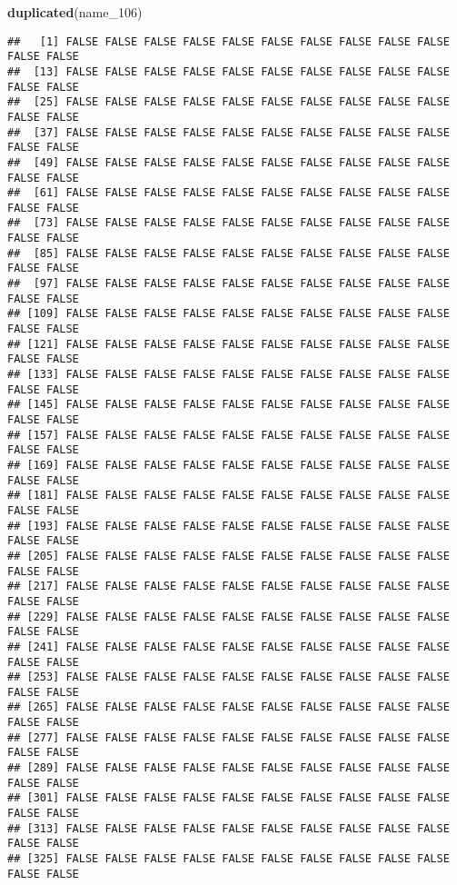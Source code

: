 \documentclass[
]{article}
\newenvironment{Shaded}{\begin{snugshade}}{\end{snugshade}}
\newcommand{\FunctionTok}[1]{\textcolor[rgb]{0.13,0.29,0.53}{\textbf{#1}}}
\newcommand{\NormalTok}[1]{#1}
\begin{document}
\begin{Shaded}
\begin{Highlighting}[]
\FunctionTok{duplicated}\NormalTok{(name\_106)}
\end{Highlighting}
\end{Shaded}

\begin{verbatim}
##   [1] FALSE FALSE FALSE FALSE FALSE FALSE FALSE FALSE FALSE FALSE FALSE FALSE
##  [13] FALSE FALSE FALSE FALSE FALSE FALSE FALSE FALSE FALSE FALSE FALSE FALSE
##  [25] FALSE FALSE FALSE FALSE FALSE FALSE FALSE FALSE FALSE FALSE FALSE FALSE
##  [37] FALSE FALSE FALSE FALSE FALSE FALSE FALSE FALSE FALSE FALSE FALSE FALSE
##  [49] FALSE FALSE FALSE FALSE FALSE FALSE FALSE FALSE FALSE FALSE FALSE FALSE
##  [61] FALSE FALSE FALSE FALSE FALSE FALSE FALSE FALSE FALSE FALSE FALSE FALSE
##  [73] FALSE FALSE FALSE FALSE FALSE FALSE FALSE FALSE FALSE FALSE FALSE FALSE
##  [85] FALSE FALSE FALSE FALSE FALSE FALSE FALSE FALSE FALSE FALSE FALSE FALSE
##  [97] FALSE FALSE FALSE FALSE FALSE FALSE FALSE FALSE FALSE FALSE FALSE FALSE
## [109] FALSE FALSE FALSE FALSE FALSE FALSE FALSE FALSE FALSE FALSE FALSE FALSE
## [121] FALSE FALSE FALSE FALSE FALSE FALSE FALSE FALSE FALSE FALSE FALSE FALSE
## [133] FALSE FALSE FALSE FALSE FALSE FALSE FALSE FALSE FALSE FALSE FALSE FALSE
## [145] FALSE FALSE FALSE FALSE FALSE FALSE FALSE FALSE FALSE FALSE FALSE FALSE
## [157] FALSE FALSE FALSE FALSE FALSE FALSE FALSE FALSE FALSE FALSE FALSE FALSE
## [169] FALSE FALSE FALSE FALSE FALSE FALSE FALSE FALSE FALSE FALSE FALSE FALSE
## [181] FALSE FALSE FALSE FALSE FALSE FALSE FALSE FALSE FALSE FALSE FALSE FALSE
## [193] FALSE FALSE FALSE FALSE FALSE FALSE FALSE FALSE FALSE FALSE FALSE FALSE
## [205] FALSE FALSE FALSE FALSE FALSE FALSE FALSE FALSE FALSE FALSE FALSE FALSE
## [217] FALSE FALSE FALSE FALSE FALSE FALSE FALSE FALSE FALSE FALSE FALSE FALSE
## [229] FALSE FALSE FALSE FALSE FALSE FALSE FALSE FALSE FALSE FALSE FALSE FALSE
## [241] FALSE FALSE FALSE FALSE FALSE FALSE FALSE FALSE FALSE FALSE FALSE FALSE
## [253] FALSE FALSE FALSE FALSE FALSE FALSE FALSE FALSE FALSE FALSE FALSE FALSE
## [265] FALSE FALSE FALSE FALSE FALSE FALSE FALSE FALSE FALSE FALSE FALSE FALSE
## [277] FALSE FALSE FALSE FALSE FALSE FALSE FALSE FALSE FALSE FALSE FALSE FALSE
## [289] FALSE FALSE FALSE FALSE FALSE FALSE FALSE FALSE FALSE FALSE FALSE FALSE
## [301] FALSE FALSE FALSE FALSE FALSE FALSE FALSE FALSE FALSE FALSE FALSE FALSE
## [313] FALSE FALSE FALSE FALSE FALSE FALSE FALSE FALSE FALSE FALSE FALSE FALSE
## [325] FALSE FALSE FALSE FALSE FALSE FALSE FALSE FALSE FALSE FALSE FALSE FALSE

\end{verbatim}
\end{document}
